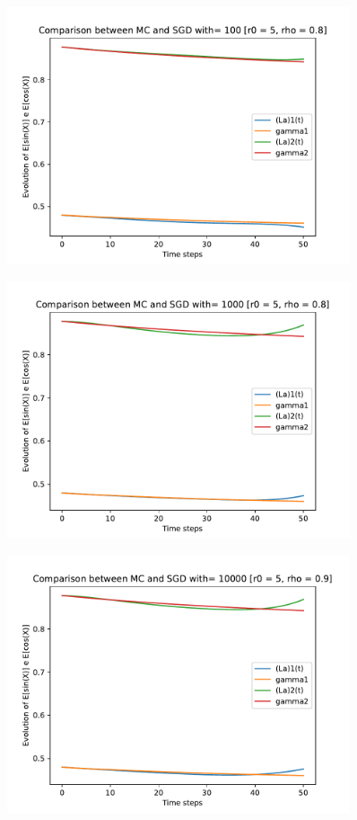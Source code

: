 \documentclass[a4paper,11pt,openright]{report}
\begin{document}
\begin{figure}[H]
\centering
\includegraphics[width=0.9\textwidth]{images/graphics T = 0.5/n = 5, M = 100 sine and cosine.pdf}
\end{figure}
\begin{figure}[H]
\centering
\includegraphics[width=0.9\textwidth]{images/graphics T = 0.5/n = 5, M = 1000 sine and cosine.pdf}
\end{figure}
\begin{figure}[H]
\centering
\includegraphics[width=0.9\textwidth]{images/graphics T = 0.5/n = 5, M = 10000 sine and cosine.pdf}
\end{figure}
\newpage
\end{document}

